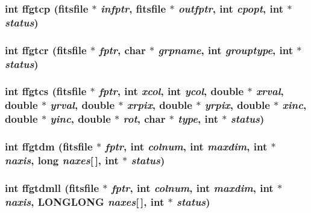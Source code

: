\subsubsection{\setlength{\rightskip}{0pt plus 5cm}int ffgtcp (\bf{fitsfile} $\ast$ {\em infptr}, \bf{fitsfile} $\ast$ {\em outfptr}, int {\em cpopt}, int $\ast$ {\em status})}\label{fitsio__64_8h_1803350e3f29d5825dd2cfaee505011c}


\subsubsection{\setlength{\rightskip}{0pt plus 5cm}int ffgtcr (\bf{fitsfile} $\ast$ {\em fptr}, char $\ast$ {\em grpname}, int {\em grouptype}, int $\ast$ {\em status})}\label{fitsio__64_8h_7329c76bb04c13abb3b2f5bf397eb001}


\subsubsection{\setlength{\rightskip}{0pt plus 5cm}int ffgtcs (\bf{fitsfile} $\ast$ {\em fptr}, int {\em xcol}, int {\em ycol}, double $\ast$ {\em xrval}, double $\ast$ {\em yrval}, double $\ast$ {\em xrpix}, double $\ast$ {\em yrpix}, double $\ast$ {\em xinc}, double $\ast$ {\em yinc}, double $\ast$ {\em rot}, char $\ast$ {\em type}, int $\ast$ {\em status})}\label{fitsio__64_8h_6042577fa44af9cdcbdffc1362a9f4a0}


\subsubsection{\setlength{\rightskip}{0pt plus 5cm}int ffgtdm (\bf{fitsfile} $\ast$ {\em fptr}, int {\em colnum}, int {\em maxdim}, int $\ast$ {\em naxis}, long {\em naxes}[$\,$], int $\ast$ {\em status})}\label{fitsio__64_8h_bc3ab97c21648b47aa3b8f883834db1d}


\subsubsection{\setlength{\rightskip}{0pt plus 5cm}int ffgtdmll (\bf{fitsfile} $\ast$ {\em fptr}, int {\em colnum}, int {\em maxdim}, int $\ast$ {\em naxis}, \bf{LONGLONG} {\em naxes}[$\,$], int $\ast$ {\em status})}\label{fitsio__64_8h_37098ac493b769dba1d2055cbc7d3c28}


